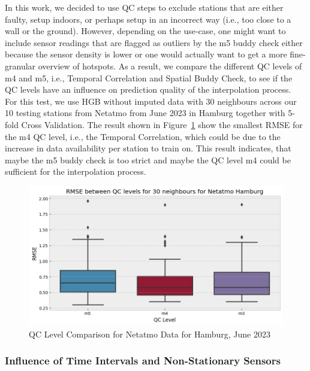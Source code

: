 In this work, we decided to use QC steps to exclude stations that are either faulty, setup indoors, or perhaps setup in an incorrect way (i.e., too close to a wall or the ground). However, depending on the use-case, one might want to include sensor readings that are flagged as outliers by the m5 buddy check either because the sensor density is lower or one would actually want to get a more fine-granular overview of hotspots. As a result, we compare the different QC levels of m4 and m5, i.e., Temporal Correlation and Spatial Buddy Check, to see if the QC levels have an influence on prediction quality of the interpolation process.\\
For this test, we use HGB without imputed data with 30 neighbours across our 10 testing stations from Netatmo  from June 2023 in Hamburg together with 5-fold Cross Validation. The result shown in Figure~\ref{fig:qc hamburg level comparison} show the smallest RMSE for the m4 QC level, i.e., the Temporal Correlation, which could be due to the increase in data availability per station to train on. This result indicates, that maybe the m5 buddy check is too strict and maybe the QC level m4 could be sufficient for the interpolation process.

\begin{figure}[ht]
    \centering
    \includegraphics[width=1\textwidth]{images/qc_hamburg_level_comparison.png}
    \caption{QC Level Comparison for Netatmo Data for Hamburg, June 2023}
    \label{fig:qc hamburg level comparison}
\end{figure}

\subsubsection{Influence of Time Intervals and Non-Stationary Sensors}

